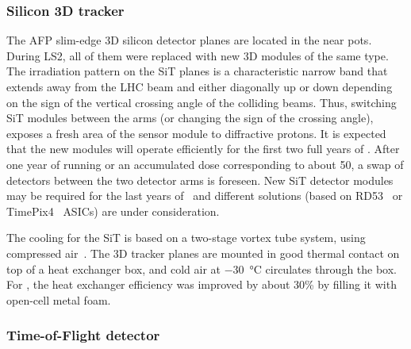 \documentclass[cernpreprint, atlasdraft=false, UKenglish,british,orcidlogo, texmf, orcidlogo]{atlasdoc}
\begin{document}
\subsubsection{Silicon 3D tracker \label{ss:sit}} 
The \gls{AFP} slim-edge 3D silicon detector planes are located in the near pots. During \gls{LS2}, all of them were replaced with new 3D modules of the same type.
The irradiation pattern on the \gls{SiT} planes is a characteristic narrow band that extends away from the \gls{LHC} beam and either diagonally up or down depending on the sign of the vertical crossing angle of the colliding beams. Thus, switching \gls{SiT} modules between the arms (or changing the sign of the crossing angle), exposes a fresh area of the sensor module to diffractive protons. It is expected that the new modules will operate efficiently for the first two full years of \RunThr.
After one year of running or an accumulated dose corresponding to about \SI{50}{\ifb}, a swap of detectors between the two detector arms is foreseen.
New \gls{SiT} detector modules may be required for the last years of \RunThr\ and different solutions (based on RD53~\cite{Garcia-Sciveres:2287593} or TimePix4~\cite{Llopart_2022} \glspl{ASIC}) are under consideration.
 
The cooling for the \gls{SiT} is based on a two-stage vortex tube system, using compressed air~\cite{Vacek_2013}. The 3D tracker planes are mounted in good thermal contact on top of a heat exchanger box, and cold air at \SI{-30}{\degreeCelsius} circulates through the box.
For \RunThr,
the heat exchanger efficiency was improved by about 30\% by filling it with open-cell metal foam.
 
\subsubsection{ Time-of-Flight detector \label{ss:tof}} 
 
\end{document}
